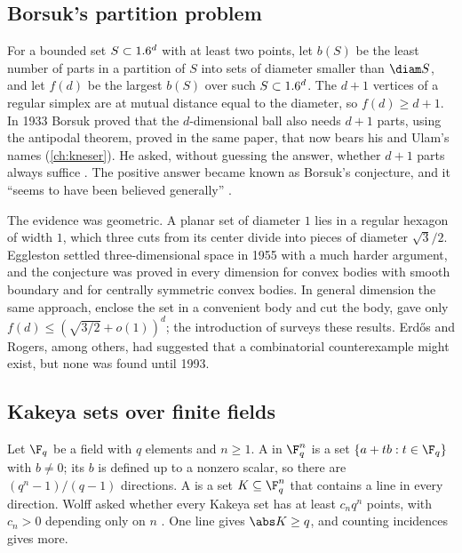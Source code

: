 \begin{refsection}
\subsection{Borsuk's partition problem}\label{sec:dimension:borsuk-before}

For a bounded set $S\subset1.6^d$ with at least two points, let $b(S)$ be the least number of parts in a partition of $S$ into sets of diameter smaller than $\diam S$, and let $f(d)$ be the largest $b(S)$ over such $S\subset1.6^d$. The $d+1$ vertices of a regular simplex are at mutual distance equal to the diameter, so $f(d)\ge d+1$. In 1933 Borsuk proved that the $d$-dimensional ball also needs $d+1$ parts, using the antipodal theorem, proved in the same paper, that now bears his and Ulam's names (\cref{ch:kneser}). He asked, without guessing the answer, whether $d+1$ parts always suffice \parencite{Borsuk1933}. The positive answer became known as Borsuk's conjecture, and it ``seems to have been believed generally'' \parencite[60]{KahnKalai1993}.

The evidence was geometric. A planar set of diameter $1$ lies in a regular hexagon of width $1$, which three cuts from its center divide into pieces of diameter $\sqrt3/2$. Eggleston settled three-dimensional space in 1955 with a much harder argument, and the conjecture was proved in every dimension for convex bodies with smooth boundary and for centrally symmetric convex bodies. In general dimension the same approach, enclose the set in a convenient body and cut the body, gave only $f(d)\le(\sqrt{3/2}+o(1))^d$; the introduction of \textcite{KahnKalai1993} surveys these results. Erd\H{o}s and Rogers, among others, had suggested that a combinatorial counterexample might exist, but none was found until 1993.

\subsection{Kakeya sets over finite fields}\label{sec:dimension:kakeya-before}

Let $\F_q$ be a field with $q$ elements and $n\ge1$. A  in $\F_q^n$ is a set $\{a+tb:t\in\F_q\}$ with $b\ne0$; its  $b$ is defined up to a nonzero scalar, so there are $(q^n-1)/(q-1)$ directions. A  is a set $K\subseteq\F_q^n$ that contains a line in every direction. Wolff asked whether every Kakeya set has at least $c_nq^n$ points, with $c_n>0$ depending only on $n$ \parencite{Wolff1999}. One line gives $\abs K\ge q$, and counting incidences gives more.


\end{refsection}
